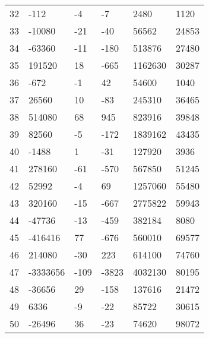 \documentclass{amsart}
\begin{document}
\begin{longtable}{llllll}
32 & -112 & -4 & -7 & 2480 & 1120\\
33 & -10080 & -21 & -40 & 56562 & 24853\\
34 & -63360 & -11 & -180 & 513876 & 27480\\
35 & 191520 & 18 & -665 & 1162630 & 30287\\
36 & -672 & -1 & 42 & 54600 & 1040\\
37 & 26560 & 10 & -83 & 245310 & 36465\\
38 & 514080 & 68 & 945 & 823916 & 39848\\
39 & 82560 & -5 & -172 & 1839162 & 43435\\
40 & -1488 & 1 & -31 & 127920 & 3936\\
41 & 278160 & -61 & -570 & 567850 & 51245\\
42 & 52992 & -4 & 69 & 1257060 & 55480\\
43 & 320160 & -15 & -667 & 2775822 & 59943\\
44 & -47736 & -13 & -459 & 382184 & 8080\\
45 & -416416 & 77 & -676 & 560010 & 69577\\
46 & 214080 & -30 & 223 & 614100 & 74760\\
47 & -3333656 & -109 & -3823 & 4032130 & 80195\\
48 & -36656 & 29 & -158 & 137616 & 21472\\
49 & 6336 & -9 & -22 & 85722 & 30615\\
50 & -26496 & 36 & -23 & 74620 & 98072\\
\hline
\end{longtable}
\end{document}
